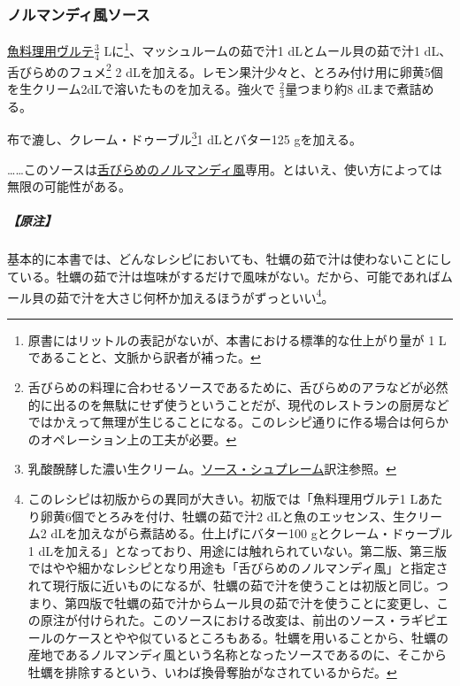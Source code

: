 \begin{recette}
{\subsubsection{ノルマンディ風ソース}\label{sauce-normande}}


 

\protect\hyperlink{veloute-de-poisson}{魚料理用ヴルテ}\(\frac{3}{4}\)
Lに\footnote{原書にはリットルの表記がないが、本書における標準的な仕上がり量が
  1 Lであることと、文脈から訳者が補った。}、マッシュルームの茹で汁1
dLとムール貝の茹で汁1 dL、舌びらめのフュメ\footnote{舌びらめの料理に合わせるソースであるために、舌びらめのアラなどが必然的に出るのを無駄にせず使うということだが、現代のレストランの厨房などではかえって無理が生じることになる。このレシピ通りに作る場合は何らかのオペレーション上の工夫が必要。}
2
dLを加える。レモン果汁少々と、とろみ付け用に卵黄5個を生クリーム2dLで溶いたものを加える。強火で
\(\frac{2}{3}\)量つまり約8 dLまで煮詰める。

布で漉し、クレーム・ドゥーブル\footnote{乳酸醗酵した濃い生クリーム。\protect\hyperlink{sauce-supreme}{ソース・シュプレーム}訳注参照。}1
dLとバター125 gを加える。

\ldots{}\ldots{}このソースは\protect\hyperlink{sole-normande}{舌びらめのノルマンディ風}専用。とはいえ、使い方によっては無限の可能性がある。

\hypertarget{nota-sauce-normande}{%
\subparagraph{【原注】}\label{nota-sauce-normande}}

基本的に本書では、どんなレシピにおいても、牡蠣の茹で汁は使わないことにしている。牡蠣の茹で汁は塩味がするだけで風味がない。だから、可能であればムール貝の茹で汁を大さじ何杯か加えるほうがずっといい\footnote{このレシピは初版からの異同が大きい。初版では「魚料理用ヴルテ1
  Lあたり卵黄6個でとろみを付け、牡蠣の茹で汁2
  dLと魚のエッセンス、生クリーム2
  dLを加えながら煮詰める。仕上げにバター100 gとクレーム・ドゥーブル1
  dLを加える」となっており、用途には触れられていない。第二版、第三版ではやや細かなレシピとなり用途も「舌びらめのノルマンディ風」と指定されて現行版に近いものになるが、牡蠣の茹で汁を使うことは初版と同じ。つまり、第四版で牡蠣の茹で汁からムール貝の茹で汁を使うことに変更し、この原注が付けられた。このソースにおける改変は、前出のソース・ラギピエールのケースとやや似ているところもある。牡蠣を用いることから、牡蠣の産地であるノルマンディ風という名称となったソースであるのに、そこから牡蠣を排除するという、いわば換骨奪胎がなされているからだ。}。


\end{recette}
